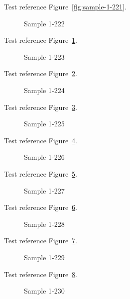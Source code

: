 Test reference Figure~\ref{fig:sample-1-221}.

\begin{figure}[tbhp]
\caption{Sample 1-222}
\label{fig:sample-1-222}
\end{figure}

Test reference Figure~\ref{fig:sample-1-222}.

\begin{figure}[tbhp]
\caption{Sample 1-223}
\label{fig:sample-1-223}
\end{figure}

Test reference Figure~\ref{fig:sample-1-223}.

\begin{figure}[tbhp]
\caption{Sample 1-224}
\label{fig:sample-1-224}
\end{figure}

Test reference Figure~\ref{fig:sample-1-224}.

\begin{figure}[tbhp]
\caption{Sample 1-225}
\label{fig:sample-1-225}
\end{figure}

Test reference Figure~\ref{fig:sample-1-225}.

\begin{figure}[tbhp]
\caption{Sample 1-226}
\label{fig:sample-1-226}
\end{figure}

Test reference Figure~\ref{fig:sample-1-226}.

\begin{figure}[tbhp]
\caption{Sample 1-227}
\label{fig:sample-1-227}
\end{figure}

Test reference Figure~\ref{fig:sample-1-227}.

\begin{figure}[tbhp]
\caption{Sample 1-228}
\label{fig:sample-1-228}
\end{figure}

Test reference Figure~\ref{fig:sample-1-228}.

\begin{figure}[tbhp]
\caption{Sample 1-229}
\label{fig:sample-1-229}
\end{figure}

Test reference Figure~\ref{fig:sample-1-229}.

\begin{figure}[tbhp]
\caption{Sample 1-230}
\label{fig:sample-1-230}
\end{figure}

